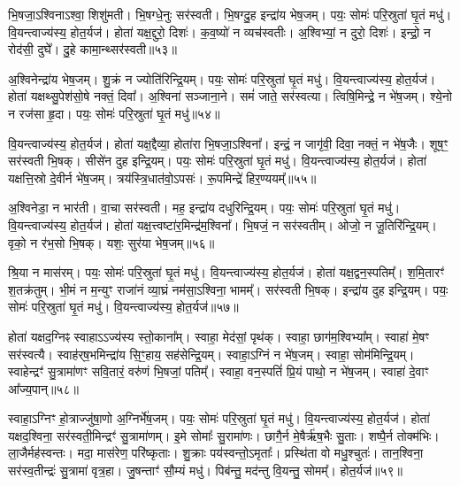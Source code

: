 भि॒षजा॒\-ऽश्विना\-ऽश्वा॒ शिशु॑मती।
भि॒षग्धे॒नुः सर॑स्वती।
भि॒षग्दु॒ह इन्द्रा॑य भेष॒जम्।
पयः॒ सोमः॑ परि॒स्रुता॑ घृ॒तं मधु॑।
वि॒यन्त्वाज्य॑स्य॒ होत॒र्यज॑।
होता॑ यक्ष॒द्दुरो॒ दिशः॑।
क॒व॒ष्यो॑ न व्यच॑स्वतीः।
अ॒श्विभ्यां॒ न दुरो॒ दिशः॑।
इन्द्रो॒ न रोद॑सी॒ दुघे᳚।
दु॒हे कामा॒न्थ्सर॑स्वती॥५३॥\ip

अ॒श्विनेन्द्रा॑य भेष॒जम्।
शु॒क्रं न ज्योति॑रिन्द्रि॒यम्।
पयः॒ सोमः॑ परि॒स्रुता॑ घृ॒तं मधु॑।
वि॒यन्त्वाज्य॑स्य॒ होत॒र्यज॑।
होता॑ यक्षथ्सु॒पेश॑सो॒षे नक्तं॒ दिवा᳚।
अ॒श्विना॑ सञ्जाना॒ने।
समं॑ जाते॒ सर॑स्वत्या।
त्विषि॒मिन्द्रे॒ न भे॑ष॒जम्।
श्ये॒नो न रज॑सा हृ॒दा।
पयः॒ सोमः॑ परि॒स्रुता॑ घृ॒तं मधु॑॥५४॥\ip

वि॒यन्त्वाज्य॑स्य॒ होत॒र्यज॑।
होता॑ यक्ष॒द्दैव्या॒ होता॑रा भि॒षजा॒\-ऽश्विना᳚।
इन्द्रं॒ न जागृ॑वी॒ दिवा॒ नक्तं॒ न भे॑ष॒जैः।
शूष॒ꣳ॒ सर॑स्वती भि॒षक्।
सीसे॑न दुह इन्द्रि॒यम्।
पयः॒ सोमः॑ परि॒स्रुता॑ घृ॒तं मधु॑।
वि॒यन्त्वाज्य॑स्य॒ होत॒र्यज॑।
होता॑ यक्षत्ति॒स्रो दे॒वीर्न भे॑ष॒जम्।
त्रय॑स्त्रि॒धात॑वो॒\-ऽपसः॑।
रू॒पमिन्द्रे॑ हिर॒ण्ययम्᳚॥५५॥\ip

अ॒श्विनेडा॒ न भार॑ती।
वा॒चा सर॑स्वती।
मह॒ इन्द्रा॑य दधुरिन्द्रि॒यम्।
पयः॒ सोमः॑ परि॒स्रुता॑ घृ॒तं मधु॑।
वि॒यन्त्वाज्य॑स्य॒ होत॒र्यज॑।
होता॑ यक्ष॒त्त्वष्टा॑र॒मिन्द्र॑म॒श्विना᳚।
भि॒षजं॒ न सर॑स्वतीम्।
ओजो॒ न जू॒तिरि॑न्द्रि॒यम्।
वृको॒ न र॑भ॒सो भि॒षक्।
यशः॒ सुर॑या भेष॒जम्॥५६॥\ip

श्रि॒या न मास॑रम्।
पयः॒ सोमः॑ परि॒स्रुता॑ घृ॒तं मधु॑।
वि॒यन्त्वाज्य॑स्य॒ होत॒र्यज॑।
होता॑ यक्ष॒द्वन॒स्पतिम्᳚।
श॒मि॒तारꣳ॑ श॒तक्र॑तुम्।
भी॒मं न म॒न्युꣳ राजा॑नं व्या॒घ्रं नम॑सा॒\-ऽश्विना॒ भामम्᳚।
सर॑स्वती भि॒षक्।
इन्द्रा॑य दुह इन्द्रि॒यम्।
पयः॒ सोमः॑ परि॒स्रुता॑ घृ॒तं मधु॑।
वि॒यन्त्वाज्य॑स्य॒ होत॒र्यज॑॥५७॥\ip

होता॑ यक्षद॒ग्निꣴ स्वाहा\-ऽऽज्य॑स्य स्तो॒काना᳚म्।
स्वाहा॒ मेद॑सां॒ पृथ॑क्।
स्वाहा॒ छाग॑म॒श्विभ्या᳚म्।
स्वाहा॑ मे॒षꣳ सर॑स्वत्यै।
स्वाह॑र्‌\mbox{}ष॒भमिन्द्रा॑य सि॒ꣳ॒हाय॒ सह॑सेन्द्रि॒यम्।
स्वाहा॒\-ऽग्निं न भे॑ष॒जम्।
स्वाहा॒ सोम॑मिन्द्रि॒यम्।
स्वाहेन्द्रꣳ॑ सु॒त्रामा॑णꣳ सवि॒तारं॒ वरु॑णं भि॒षजां॒ पतिम्᳚।
स्वाहा॒ वन॒स्पतिं॑ प्रि॒यं पाथो॒ न भे॑ष॒जम्।
स्वाहा॑ दे॒वाꣳ आ᳚ज्य॒पान्॥५८॥\ip

स्वाहा॒\-ऽग्निꣳ हो॒त्राज्जु॑षा॒णो अ॒ग्निर्भे॑ष॒जम्।
पयः॒ सोमः॑ परि॒स्रुता॑ घृ॒तं मधु॑।
वि॒यन्त्वाज्य॑स्य॒ होत॒र्यज॑।
होता॑ यक्षद॒श्विना॒ सर॑स्वती॒मिन्द्रꣳ॑ सु॒त्रामा॑णम्।
इ॒मे सोमाः᳚ सु॒रामा॑णः।
छागै॒र्न मे॒षैर्\mbox{}ऋ॑ष॒भैः सु॒ताः।
शष्पै॒र्न तोक्म॑भिः।
ला॒जैर्मह॑स्वन्तः।
मदा॒ मास॑रेण॒ परि॑ष्कृताः।
शु॒क्राः पय॑स्वन्तो॒\-ऽमृताः᳚।
प्रस्थि॑ता वो मधु॒श्चुतः॑।
तान॒श्विना॒ सर॑स्व॒तीन्द्रः॑ सु॒त्रामा॑ वृत्र॒हा।
जु॒षन्ताꣳ॑ सौ॒म्यं मधु॑।
पिब॑न्तु॒ मद॑न्तु वि॒यन्तु॒ सोमम्᳚।
होत॒र्यज॑॥५९॥\ip{}


